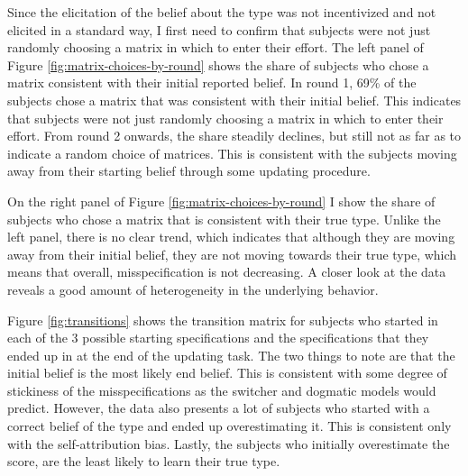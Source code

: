 \documentclass[
  12pt,
]{article}
\begin{document}
Since the elicitation of the belief about the type was not incentivized
and not elicited in a standard way, I first need to confirm that
subjects were not just randomly choosing a matrix in which to enter
their effort. The left panel of Figure \ref{fig:matrix-choices-by-round}
shows the share of subjects who chose a matrix consistent with their
initial reported belief. In round 1, 69\% of the subjects chose a matrix
that was consistent with their initial belief. This indicates that
subjects were not just randomly choosing a matrix in which to enter
their effort. From round 2 onwards, the share steadily declines, but
still not as far as to indicate a random choice of matrices. This is
consistent with the subjects moving away from their starting belief
through some updating procedure.

On the right panel of Figure \ref{fig:matrix-choices-by-round} I show
the share of subjects who chose a matrix that is consistent with their
true type. Unlike the left panel, there is no clear trend, which
indicates that although they are moving away from their initial belief,
they are not moving towards their true type, which means that overall,
misspecification is not decreasing. A closer look at the data reveals a
good amount of heterogeneity in the underlying behavior.

Figure \ref{fig:transitions} shows the transition matrix for subjects
who started in each of the 3 possible starting specifications and the
specifications that they ended up in at the end of the updating task.
The two things to note are that the initial belief is the most likely
end belief. This is consistent with some degree of stickiness of the
misspecifications as the switcher and dogmatic models would predict.
However, the data also presents a lot of subjects who started with a
correct belief of the type and ended up overestimating it. This is
consistent only with the self-attribution bias. Lastly, the subjects who
initially overestimate the score, are the least likely to learn their
true type.
\end{document}

